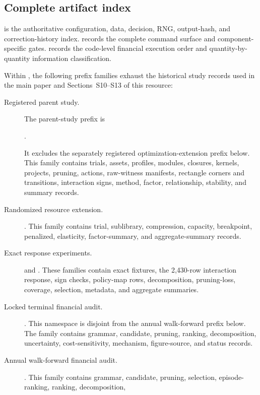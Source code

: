 \subsection{Complete artifact index}

 is the authoritative configuration, data,
decision, RNG, output-hash, and correction-history index.
 records the complete command surface and
component-specific gates.   records
the code-level financial execution order and quantity-by-quantity information
classification.

Within , the following prefix families
exhaust the historical study records used in the main paper and
Sections~S10--S13 of this resource:
\begin{description}
  \item[Registered parent study.]
  The parent-study prefix is
  \begin{center}
  .
  \end{center}
  It excludes the separately registered optimization-extension prefix below.
  This family contains trials, assets,
  profiles, modules, closures, kernels, projects, pruning, actions, raw-witness
  manifests, rectangle corners and transitions, interaction signs, method,
  factor, relationship, stability, and summary records.
  \item[Randomized resource extension.]
  .  This family contains trial,
  sublibrary, compression, capacity, breakpoint, penalized, elasticity,
  factor-summary, and aggregate-summary records.
  \item[Exact response experiments.]
   and .  These
  families contain exact fixtures, the 2,430-row interaction response, sign
  checks, policy-map rows, decomposition, pruning-loss, coverage, selection,
  metadata, and aggregate summaries.
  \item[Locked terminal financial audit.]
  .  This namespace is disjoint from the
  annual walk-forward prefix below.  The
  family contains grammar, candidate, pruning, ranking, decomposition,
  uncertainty, cost-sensitivity, mechanism, figure-source, and status records.
  \item[Annual walk-forward financial audit.]
  .  This family contains grammar,
  candidate, pruning, selection, episode-ranking, ranking, decomposition,

\end{description}
